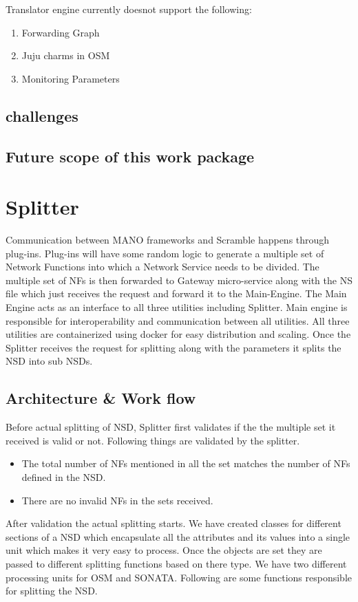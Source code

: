 Translator engine currently doesnot support the following:
\begin{enumerate}
	\item Forwarding Graph
	\item Juju charms in OSM
	\item Monitoring Parameters
\end{enumerate}

\subsection{challenges}
\subsection{Future scope of this work package}

\section{Splitter}
Communication between MANO frameworks and Scramble happens through plug-ins. Plug-ins will have some random logic to generate a multiple set of Network Functions into which a Network Service needs to be divided. The multiple set of NFs is then forwarded to Gateway micro-service along with the NS file which just receives the request and forward it to the Main-Engine. The Main Engine acts as an interface to all three utilities including Splitter. Main engine is responsible for interoperability and communication between all utilities. All three utilities are containerized using docker for easy distribution and scaling. Once the Splitter receives the request for splitting along with the parameters it splits the NSD into sub NSDs.
\subsection{Architecture \& Work flow}
Before actual splitting of NSD, Splitter first validates if the the multiple set it received is valid or not. Following things are validated by the splitter.
\begin{itemize}
	\item The total number of NFs mentioned in all the set matches the number of NFs defined in the NSD.
	\item There are no invalid NFs in the sets received.
\end{itemize}

After validation the actual splitting starts. We have created classes for different sections of a NSD which encapsulate all the attributes and its values into a single unit which makes it very easy to process. Once the objects are set they are passed to different splitting functions based on there type. We have two different processing units for OSM and SONATA. Following are some functions responsible for splitting the NSD.

